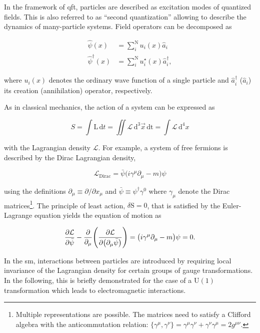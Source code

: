 In the framework of \gls{qft}, particles are described as excitation modes of quantized fields. This is also referred to as ``second quantization'' allowing to describe the dynamics of many-particle systems. Field operators can be decomposed as

\begin{align}
    \hat{\psi}(x)&=\sum_{i}^{\mathrm{N}}u_{i}(x)\hat{a}_{i} \\
    \hat{\psi}^{\dagger}(x)&=\sum_{i}^{\mathrm{N}}u^{\star}_{i}(x)\hat{a}^{\dagger}_{i},
\end{align}

where $u_{i}(x)$ denotes the ordinary wave function of a single particle and $\hat{a}^{\dagger}_{i}$ ($\hat{a}_{i}$) its creation (annihilation) operator, respectively.

As in classical mechanics, the action of a system can be expressed as

\begin{equation}
S=\int\mathrm{L}\,\mathrm{d}t=\iint\mathcal{L}\,\mathrm{d}^{3}\vec{x}\,\mathrm{dt}=\int\mathcal{L}\,\mathrm{d}^{4}x
\end{equation}

with the Lagrangian density $\mathcal{L}$. For example, a system of free fermions is described by the Dirac Lagrangian density,

\begin{equation}
\label{eq:theory-diracL}
\mathcal{L}_\mathrm{Dirac}=\bar{\psi}\big(i\gamma^\mu\partial_\mu-m\big)\psi
\end{equation}

using the definitions $\partial_\mu\equiv\partial/\partial x_\mu$ and $\bar{\psi}\equiv\psi^\dagger\gamma^{0}$ where $\gamma_\mu$ denote the Dirac matrices\footnote{Multiple representations are possible. The matrices need to satisfy a Clifford algebra with the anticommutation relation: $\big\{\gamma^\mu,\gamma^\nu\big\}=\gamma^\mu\gamma^\nu+\gamma^\nu\gamma^\mu=2g^{\mu\nu}$.}. The principle of least action, $\delta \mathrm{S}=0$, that is satisfied by the Euler-Lagrange equation yields the equation of motion as

\begin{equation}
\frac{\partial\mathcal{L}}{\partial\bar{\psi}}-\frac{\partial}{\partial_\mu}\Bigg(\frac{\partial\mathcal{L}}{\partial\big(\partial_\mu\bar{\psi}\big)}\Bigg)=\big(i\gamma^\mu\partial_\mu-m\big)\psi=0. \\
\end{equation}

In the \gls{sm}, interactions between particles are introduced by requiring local invariance of the Lagrangian density for certain groups of gauge transformations. In the following, this is briefly demonstrated for the case of a $\mathrm{U(1)}$ transformation which leads to electromagnetic interactions.

